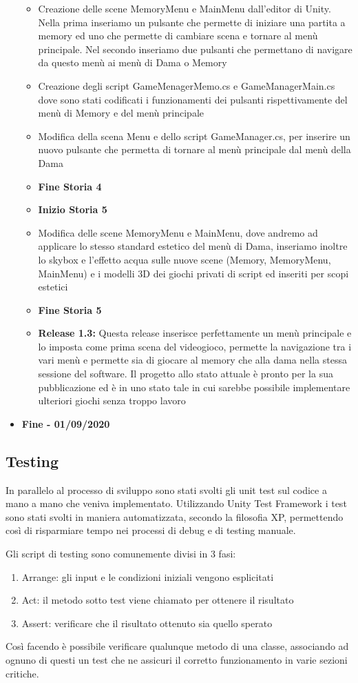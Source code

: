 \documentclass[12pt]{article}
\begin{document}
\begin{itemize}
\begin{itemize}
	\item Creazione delle scene MemoryMenu e MainMenu dall'editor di Unity. Nella prima inseriamo un pulsante che permette di iniziare una partita a memory ed uno che permette di cambiare scena e tornare al menù principale. Nel secondo inseriamo due pulsanti che permettano di navigare da questo menù ai menù di Dama o Memory
	\item Creazione degli script GameMenagerMemo.cs e GameManagerMain.cs dove sono stati codificati i funzionamenti dei pulsanti rispettivamente del menù di Memory e del menù principale
	\item Modifica della scena Menu e dello script GameManager.cs, per inserire un nuovo pulsante che permetta di tornare al menù principale dal menù della Dama
	\item \textbf{Fine Storia 4}
	\item \textbf{Inizio Storia 5}
	\item Modifica delle scene MemoryMenu e MainMenu, dove andremo ad applicare lo stesso standard estetico del menù di Dama, inseriamo inoltre lo skybox e l'effetto acqua sulle nuove scene (Memory, MemoryMenu, MainMenu) e i modelli 3D dei giochi privati di script ed inseriti per scopi estetici
	\item \textbf{Fine Storia 5}
	\item \textbf{Release 1.3:} Questa release inserisce perfettamente un menù principale e lo imposta come prima scena del videogioco, permette la navigazione tra i vari menù e permette sia di giocare al memory che alla dama nella stessa sessione del software. Il progetto allo stato attuale è pronto per la sua pubblicazione ed è in uno stato tale in cui sarebbe possibile implementare ulteriori giochi senza troppo lavoro
	\end{itemize}
\item \textbf{Fine - 01/09/2020}
\end{itemize}

\subsection{Testing}
In parallelo al processo di sviluppo sono stati svolti gli unit test sul codice a mano a mano che veniva implementato. Utilizzando Unity Test Framework i test sono stati svolti in maniera automatizzata, secondo la filosofia XP, permettendo così di risparmiare tempo nei processi di debug e di testing manuale.

Gli script di testing sono comunemente divisi in 3 fasi:
\begin{enumerate}
\item Arrange: gli input e le condizioni iniziali vengono esplicitati
\item Act: il metodo sotto test viene chiamato per ottenere il risultato
\item Assert: verificare che il risultato ottenuto sia quello sperato
\end{enumerate}
Così facendo è possibile verificare qualunque metodo di una classe, associando ad ognuno di questi un test che ne assicuri il corretto funzionamento in varie sezioni critiche.
\end{document}

